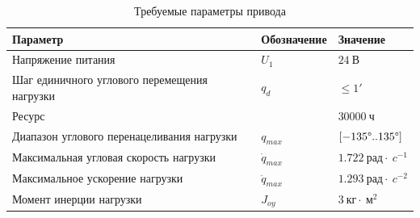 \begin{table}[h!]
    \centering
    \begin{tabu}{X[l]|X[-1,c,m]|X[-1,l,m]} \hline
        Параметр                                    & Обозначение      & Значение                                       \\ \hline
        Напряжение питания                          & $U_1$            & $24 ~\textit{В} $                              \\
        Шаг единичного углового перемещения нагрузки& $q_d$            & $ \le 1' $                                     \\
        Ресурс                                      &                  & $30000 ~\textit{ч} $                           \\
        Диапазон углового перенацеливания нагрузки  & $q_{max}$        & $[-135\degree .. 135\degree] $                 \\
        Максимальная угловая скорость нагрузки      & $\dot{q}_{max}$  & $1.722 ~\textit{рад} \cdot ~\textit{c}^{-1}$   \\
        Максимальное ускорение нагрузки             & $\ddot{q}_{max}$ & $1.293 ~\textit{рад} \cdot ~\textit{c}^{-2}$   \\
        Момент инерции нагрузки                     & $J_{oy}$         & $3 ~\textit{кг} \cdot ~\textit{м}^2 $          \\ \hline
    \end{tabu}
    \caption{Требуемые параметры привода}
    \label{drive_parameters_tbl}
\end{table}


